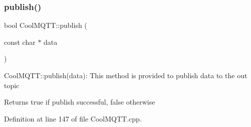 \subsubsection{\texorpdfstring{publish()}{publish()}\hspace{0.1cm}{\footnotesize\ttfamily [1/2]}}
{\footnotesize\ttfamily bool Cool\+M\+Q\+T\+T\+::publish (\begin{DoxyParamCaption}\item[{const char $\ast$}]{data }\end{DoxyParamCaption})}

Cool\+M\+Q\+T\+T\+::publish(data)\+: This method is provided to publish data to the out topic

\begin{DoxyReturn}{Returns}
true if publish successful, false otherwise 
\end{DoxyReturn}


Definition at line 147 of file Cool\+M\+Q\+T\+T.\+cpp.



